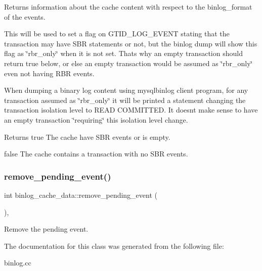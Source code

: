 Returns information about the cache content with respect to the binlog\+\_\+format of the events.

This will be used to set a flag on G\+T\+I\+D\+\_\+\+L\+O\+G\+\_\+\+E\+V\+E\+NT stating that the transaction may have S\+BR statements or not, but the binlog dump will show this flag as \char`\"{}rbr\+\_\+only\char`\"{} when it is not set. That\textquotesingle{}s why an empty transaction should return true below, or else an empty transaction would be assumed as \char`\"{}rbr\+\_\+only\char`\"{} even not having R\+BR events.

When dumping a binary log content using mysqlbinlog client program, for any transaction assumed as \char`\"{}rbr\+\_\+only\char`\"{} it will be printed a statement changing the transaction isolation level to R\+E\+AD C\+O\+M\+M\+I\+T\+T\+ED. It doesn\textquotesingle{}t make sense to have an empty transaction \char`\"{}requiring\char`\"{} this isolation level change.

\begin{DoxyReturn}{Returns}
true The cache have S\+BR events or is empty. 

false The cache contains a transaction with no S\+BR events. 
\end{DoxyReturn}
\mbox{\label{classbinlog__cache__data_a9509b322827891d70e256bed2e9e2eb1}} 
\subsubsection{\texorpdfstring{remove\+\_\+pending\+\_\+event()}{remove\_pending\_event()}}
{\footnotesize\ttfamily int binlog\+\_\+cache\+\_\+data\+::remove\+\_\+pending\+\_\+event (\begin{DoxyParamCaption}{ }\end{DoxyParamCaption})\hspace{0.3cm}{\ttfamily [inline]}, {\ttfamily [protected]}}

Remove the pending event. 

The documentation for this class was generated from the following file\+:\begin{DoxyCompactItemize}
\item 
binlog.\+cc\end{DoxyCompactItemize}
